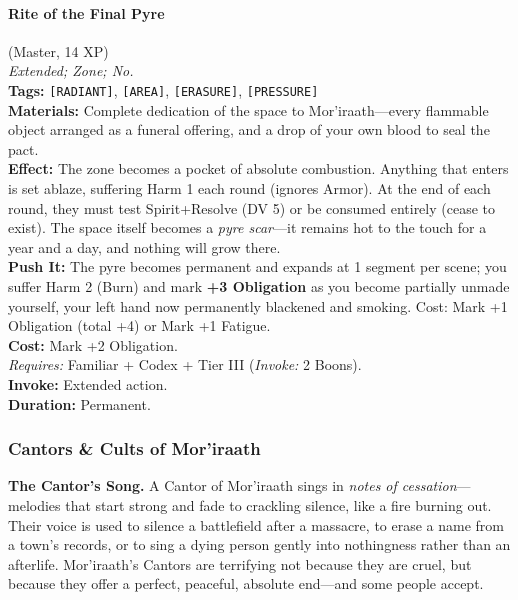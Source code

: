 \paragraph{Rite of the Final Pyre} (Master, 14 XP) \hfill \\
\emph{Extended; Zone; No.} \\
\textbf{Tags:} \texttt{[RADIANT]}, \texttt{[AREA]}, \texttt{[ERASURE]}, \texttt{[PRESSURE]} \\
\textbf{Materials:} Complete dedication of the space to Mor'iraath---every flammable object arranged as a funeral offering, and a drop of your own blood to seal the pact. \\
\textbf{Effect:} The zone becomes a pocket of absolute combustion. Anything that enters is set ablaze, suffering Harm 1 each round (ignores Armor). At the end of each round, they must test Spirit+Resolve (DV 5) or be consumed entirely (cease to exist). The space itself becomes a \textit{pyre scar}---it remains hot to the touch for a year and a day, and nothing will grow there. \\
\textbf{Push It:} The pyre becomes permanent and expands at 1 segment per scene; you suffer Harm 2 (Burn) and mark \textbf{+3 Obligation} as you become partially unmade yourself, your left hand now permanently blackened and smoking. Cost: Mark +1 Obligation (total +4) or Mark +1 Fatigue. \\
\textbf{Cost:} Mark +2 Obligation. \\
\textit{Requires:} Familiar + Codex + Tier III (\textit{Invoke:} 2 Boons). \\
\textbf{Invoke:} Extended action. \\
\textbf{Duration:} Permanent.

\subsubsection*{Cantors \& Cults of Mor'iraath}

\textbf{The Cantor's Song.} A Cantor of Mor'iraath sings in \textit{notes of cessation}---melodies that start strong and fade to crackling silence, like a fire burning out. Their voice is used to silence a battlefield after a massacre, to erase a name from a town's records, or to sing a dying person gently into nothingness rather than an afterlife. Mor'iraath's Cantors are terrifying not because they are cruel, but because they offer a perfect, peaceful, absolute end---and some people accept.

